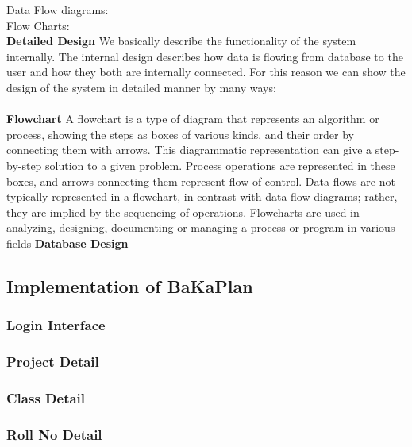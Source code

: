 Data Flow diagrams:
\\
\newpage
Flow Charts:
\\
{\centering \bf Detailed Design}
We basically describe the functionality of the system internally. 
The internal design describes how data is flowing from database to the 
user and how they both are internally connected. For this reason we 
can show the design of the system in detailed manner by many ways: \\\\
{\bf Flowchart } A flowchart is a type of diagram that represents an
algorithm or process, showing the steps as boxes of various kinds, and
their order by connecting them with arrows. This diagrammatic
representation can give a step-by-step solution to a given problem.
Process operations are represented in these boxes, and arrows
connecting them represent flow of control. Data flows are not
typically represented in a flowchart, in contrast with data flow
diagrams; rather, they are implied by the sequencing of operations.
Flowcharts are used in analyzing, designing, documenting or managing a
process or program in various fields
\newpage
{\bf Database Design}
\newpage
{}

\newpage

\subsection{Implementation of BaKaPlan}


\subsubsection{Login Interface}
\newpage
\subsubsection{Project Detail}
\newpage
\subsubsection{Class Detail}
\newpage
\subsubsection{Roll No Detail}
\newpage
